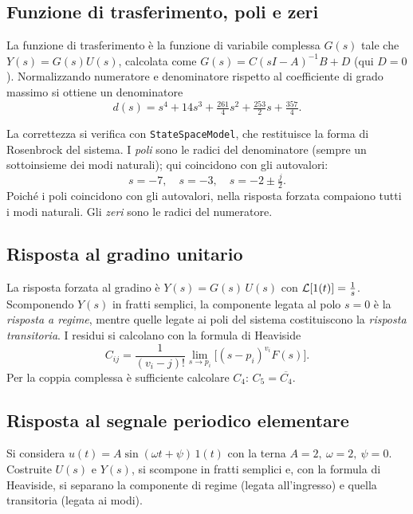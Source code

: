 \subsection{Funzione di trasferimento, poli e zeri}
La funzione di trasferimento è la funzione di variabile complessa $G(s)$ tale che
$Y(s)=G(s)U(s)$, calcolata come $G(s)=C(sI-A)^{-1}B+D$ (qui $D=0$). Normalizzando
numeratore e denominatore rispetto al coefficiente di grado massimo si ottiene un
denominatore
\[
d(s)=s^4+14s^3+\tfrac{261}{4}s^2+\tfrac{253}{2}s+\tfrac{357}{4}.
\]


La correttezza si verifica con \texttt{StateSpaceModel}, che restituisce la forma di
Rosenbrock del sistema. I \emph{poli} sono le radici del denominatore (sempre un
sottoinsieme dei modi naturali); qui coincidono con gli autovalori:
\[
s=-7,\quad s=-3,\quad s=-2\pm\tfrac{j}{2}.
\]
Poiché i poli coincidono con gli autovalori, nella risposta forzata compaiono tutti i
modi naturali. Gli \emph{zeri} sono le radici del numeratore.

\subsection{Risposta al gradino unitario}
La risposta forzata al gradino è $Y(s)=G(s)\,U(s)$ con $\mathcal{L}[1(t)]=\tfrac1s$.
Scomponendo $Y(s)$ in fratti semplici, la componente legata al polo $s=0$ è la
\emph{risposta a regime}, mentre quelle legate ai poli del sistema costituiscono la
\emph{risposta transitoria}. I residui si calcolano con la formula di Heaviside
\[
C_{ij}=\frac{1}{(v_i-j)!}\lim_{s\to p_i}\Big[(s-p_i)^{v_i}F(s)\Big].
\]
Per la coppia complessa è sufficiente calcolare $C_4$: $C_5=\overline{C_4}$.


\subsection{Risposta al segnale periodico elementare}
Si considera $u(t)=A\sin(\omega t+\psi)\,1(t)$ con la terna $A=2,\ \omega=2,\ \psi=0$.
Costruite $U(s)$ e $Y(s)$, si scompone in fratti semplici e, con la formula di
Heaviside, si separano la componente di regime (legata all'ingresso) e quella
transitoria (legata ai modi).


